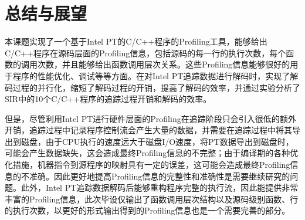 
\chapter{总结与展望}
本课题实现了一个基于Intel PT的C/C++程序的Profiling工具，能够给出C/C++程序在源码层面的Profiling信息，包括源码的每一行的执行次数，每个函数的调用次数，并且能够给出函数调用层次关系。这些Profiling信息能够很好的用于程序的性能优化、调试等等方面。在对Intel PT追踪数据进行解码时，实现了解码过程的并行化，缩短了解码过程的开销，提高了解码的效率，并通过实验分析了SIR中的10个C/C++程序的追踪过程开销和解码的效率。

但是，尽管利用Intel PT进行硬件层面的Profiling在追踪阶段只会引入很低的额外开销，追踪过程中记录程序控制流会产生大量的数据，并需要在追踪过程中将其导出到磁盘，由于CPU执行的速度远大于磁盘I/O速度，将PT数据导出到磁盘时，可能会产生数据缺失，这会造成最终Profiling信息的不完整；由于编译期的各种优化措施，机器指令到源程序的映射具有一定的误差，这可能会造成最终Profiling信息的不准确。因此更好地提高Profiling信息的完整性和准确性是需要继续研究的问题。此外，Intel PT追踪数据解码后能够重构程序完整的执行流，因此能提供非常丰富的Profiling信息，此次毕设仅输出了函数调用层次结构以及源码级别函数、行的执行次数，以更好的形式输出得到的Profiling信息也是一个需要完善的部分。